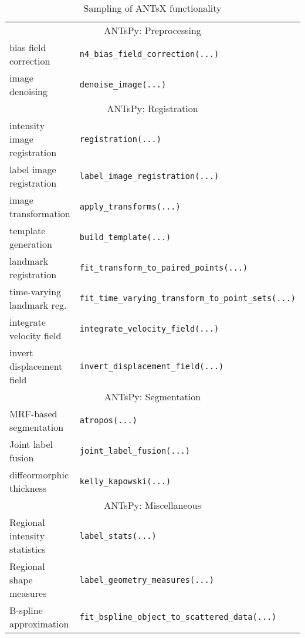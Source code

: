 
\begin{table}[!h]
  \small
   \centering
   \vspace{-0.25cm}
   \caption{Sampling of ANTsX functionality} 
   \begin{tabular*}{0.95\textwidth}{l @{\extracolsep{\fill}} p{}}
    \toprule
    \multicolumn{2}{c}{\cellcolor{gray!25} ANTsPy: Preprocessing} \\
    \cmidrule[1pt](lr){1-2}
    bias field correction & \texttt{n4\_bias\_field\_correction(...)} \\
    image denoising  & \texttt{denoise\_image(...)} \\
    \cmidrule[1pt](lr){1-2}
    \multicolumn{2}{c}{\cellcolor{gray!25} ANTsPy: Registration} \\
    \cmidrule[1pt](lr){1-2}
    intensity image registration & \texttt{registration(...)} \\
    label image registration & \texttt{label\_image\_registration(...)} \\
    image transformation & \texttt{apply\_transforms(...)} \\
    template generation  & \texttt{build\_template(...)} \\
    landmark registration & \texttt{fit\_transform\_to\_paired\_points(...)} \\
    time-varying landmark reg. & \texttt{fit\_time\_varying\_transform\_to\_point\_sets(...)} \\
    integrate velocity field & \texttt{integrate\_velocity\_field(...)} \\
    invert displacement field & \texttt{invert\_displacement\_field(...)} \\
    \cmidrule[1pt](lr){1-2}
    \multicolumn{2}{c}{\cellcolor{gray!25} ANTsPy: Segmentation} \\
    \cmidrule[1pt](lr){1-2}
    MRF-based segmentation & \texttt{atropos(...)} \\
    Joint label fusion & \texttt{joint\_label\_fusion(...)} \\
    diffeormorphic thickness   & \texttt{kelly\_kapowski(...)} \\
    \cmidrule[1pt](lr){1-2}
    \multicolumn{2}{c}{\cellcolor{gray!25} ANTsPy: Miscellaneous} \\
    \cmidrule[1pt](lr){1-2}
    Regional intensity statistics & \texttt{label\_stats(...)} \\
    Regional shape measures & \texttt{label\_geometry\_measures(...)} \\
    B-spline approximation & \texttt{fit\_bspline\_object\_to\_scattered\_data(...)} \\

\end{tabular*}
\end{table}
